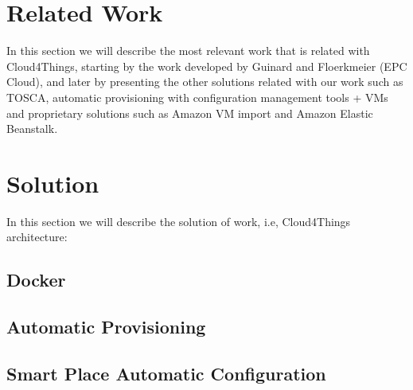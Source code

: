 \documentclass{../llncs2e/llncs}
\begin{document}
\section{Related Work}
\label{sec:related_work}
In this section we will describe the most relevant work that is related with Cloud4Things, starting
by the work developed by Guinard and Floerkmeier (EPC Cloud), and later by presenting the other
solutions related with our work such as TOSCA, automatic provisioning with configuration management
tools + VMs and proprietary solutions such as Amazon VM import and Amazon Elastic Beanstalk.
\section{Solution}
\label{sec:solution}
In this section we will describe the solution of work, i.e, Cloud4Things architecture:
\subsection{Docker}
\label{sub:docker}
\subsection{Automatic Provisioning}
\label{sub:Automatic Provisioning}
\subsection{Smart Place Automatic Configuration}
\label{sub:Smart Place Automatic Configuration}
\end{document}
